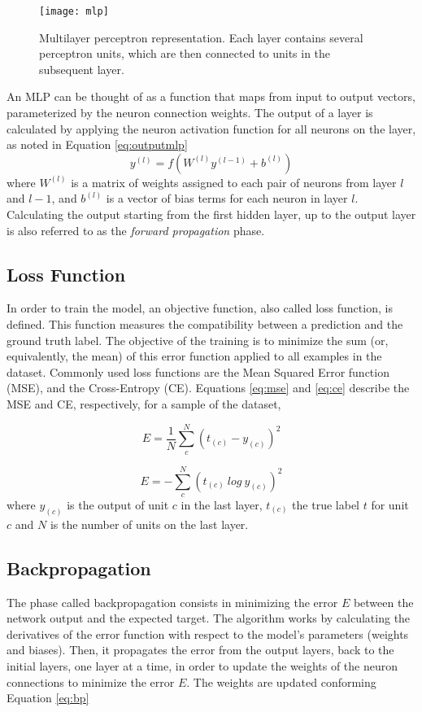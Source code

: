 \begin{figure}[!htb]
\centering
\texttt{[image: mlp]}
\caption{Multilayer perceptron representation. Each layer contains several perceptron units, which are then connected to units in the subsequent layer.}
\label{mlp}
\end{figure}

An MLP can be thought of as a function that maps from input to output vectors, parameterized by the neuron connection weights. The output of a layer
is calculated by applying the neuron activation function for all neurons on the layer, as
noted in Equation \ref{eq:outputmlp}
\begin{equation}
y^{(l)} = f(W^{(l)} y^{(l-1)} + b^{(l)})
\label{eq:outputmlp}
\end{equation}
where $W^{(l)}$ is a matrix of weights assigned to each pair of neurons from layer $l$ and $l-1$, and $b^{(l)}$ is a vector of bias terms for each neuron in layer $l$. Calculating the output starting from the first hidden layer, up to the output layer is also referred to as the \textit{forward propagation} phase.

\subsection{Loss Function}
In order to train the model, an objective function, also called loss function, is defined.
This function measures the compatibility between a prediction and the ground truth label. The
objective of the training is to minimize the sum (or, equivalently, the mean) of
this error function applied to all examples in the dataset. Commonly used loss functions
are the Mean Squared Error function (MSE), and the Cross-Entropy (CE). Equations \ref{eq:mse} and \ref{eq:ce} describe the MSE and CE, respectively, for a sample of the dataset,

\begin{equation}
E =  \frac{1}{N} \sum_{c}^{N} (t_{(c)} - y^{}_{(c)} )^2 
\label{eq:mse}
\end{equation}

\begin{equation}
E = - \sum_{c}^{N} (t_{(c)} \: log \: y^{}_{(c)} )^2 
\label{eq:ce}
\end{equation} where $y^{}_{(c)}$ is the output of unit $c$ in the last layer, $t_{(c)}$
the true label $t$ for unit $c$ and $N$ is the number of units on the last layer.
\subsection{Backpropagation}
The phase called backpropagation consists in minimizing the error $E$ between the network output and the expected target. The algorithm works by calculating the derivatives of the error
function with respect to the model’s parameters (weights and biases). Then, it propagates the error from the output layers, back to the initial layers, one layer at a time, in order to update the weights of the neuron connections to minimize the error $E$. The weights are updated conforming Equation \ref{eq:bp}

